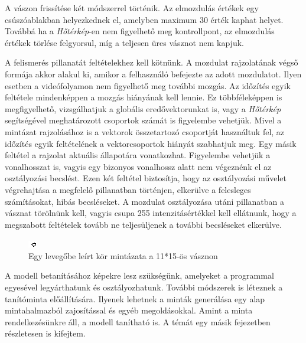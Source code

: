 A vászon frissítése két módszerrel történik. Az elmozdulás értékek egy csúszóablakban helyezkednek el, amelyben maximum  30 érték kaphat helyet. Továbbá ha a \textit{Hőtérkép}-en nem figyelhető meg kontrollpont, az elmozdulás értékek törlése felgyorsul, míg a teljesen üres vásznot nem kapjuk.

A felismerés pillanatát feltételekhez kell kötnünk. A mozdulat rajzolatának végső formája akkor alakul ki, amikor a felhasználó befejezte az adott mozdulatot. Ilyen esetben a videófolyamon nem figyelhető meg további mozgás. Az időzítés egyik feltétele mindenképpen a mozgás hiányának kell lennie. Ez többféleképpen is megfigyelhető, vizsgálhatjuk a globális eredővektorunkat is, vagy a \textit{Hőtérkép} segítségével meghatározott csoportok számát is figyelembe vehetjük. Mivel a mintázat rajzolásához is a vektorok összetartozó csoportját használtuk fel, az időzítés egyik feltételének a vektorcsoportok hiányát szabhatjuk meg. Egy másik feltétel a rajzolat aktuális állapotára vonatkozhat. Figyelembe vehetjük a vonalhosszat is, vagyis egy bizonyos vonalhossz alatt nem végeznénk el az osztályozási becslést. Ezen két feltétel biztosítja, hogy az osztályozási művelet végrehajtása a megfelelő pillanatban történjen, elkerülve a felesleges számításokat, hibás becsléseket.
A mozdulat osztályozása utáni pillanatban a vásznat törölnünk kell, vagyis csupa 255 intenzitásértékkel kell ellátnunk, hogy a megszabott feltételek tovább ne teljesüljenek a további becsléseket elkerülve.

\begin{figure}[h]
\centering
\includegraphics[width=11.2truecm, height=6.3truecm]{images/OCR-Gesture.png}
\caption{Egy levegőbe leírt kör mintázata a 11*15-ös vásznon}
\label{fig:ocr-gesture}
\end{figure}

A modell betanításához képekre lesz szükségünk, amelyeket a programmal egyesével legyárthatunk és osztályozhatunk. További módszerek is léteznek a tanítóminta előállítására. Ilyenek lehetnek a minták generálása egy alap mintahalmazból zajosítással és egyéb megoldásokkal. Amint a minta rendelkezésünkre áll, a modell tanítható is. A témát egy másik fejezetben részletesen is kifejtem.
